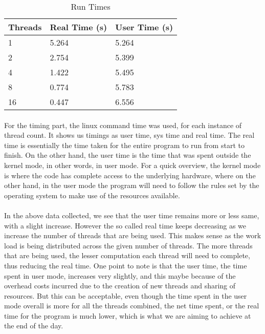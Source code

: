 \documentclass{article}
\begin{document}
\begin{table}[H]
    \centering
    \begin{tabular}{|l|l|l|}
        \hline
        Threads & Real Time (s) & User Time (s) \\ \hline
        1  & 5.264 & 5.264 \\ \hline
        2  & 2.754 & 5.399 \\ \hline
        4  & 1.422 & 5.495 \\ \hline
        8  & 0.774 & 5.783 \\ \hline
        16 & 0.447 & 6.556 \\ \hline
    \end{tabular}
    \caption{Run Times}
    \label{tab:data}
\end{table}

\paragraph{}
For the timing part, the linux command time was used, for each instance of thread count. It shows us timings as user time, sys time and real time. The real time is essentially the time taken for the entire program to run from start to finish. On the other hand, the user time is the time that was spent outside the kernel mode, in other words, in user mode. For a quick overview, the kernel mode is where the code has complete access to the underlying hardware, where on the other hand, in the user mode the program will need to follow the rules set by the operating system to make use of the resources available. 

\paragraph{}
In the above data collected, we see that the user time remains more or less same, with a slight increase. However the so called real time keeps decreasing as we increase the number of threads that are being used. This makes sense as the work load is being distributed across the given number of threads. The more threads that are being used, the lesser computation each thread will need to complete, thus reducing the real time. One point to note is that the user time, the time spent in user mode, increases very slightly, and this maybe because of the overhead costs incurred due to the creation of new threads and sharing of resources. But this can be acceptable, even though the time spent in the user mode overall is more for all the threads combined, the net time spent, or the real time for the program is much lower, which is what we are aiming to achieve at the end of the day. 
\end{document}
